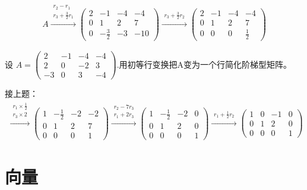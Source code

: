 \documentclass[a4paper]{report}
\begin{document}
\begin{jie}
\begin{align*}
A\xrightarrow{\substack{r_{2}-r_{1}\\ r_{3}+\frac{3}{2}r_{1}}}
{
\begin{pmatrix}
2&-1&-4&-4\\
0&1&2&7\\
0&-\frac{3}{2}&-3&-10
\end{pmatrix}
}\xrightarrow{\substack{ r_{3}+\frac{3}{2}r_{2}}}
{
\begin{pmatrix}
2&-1&-4&-4\\
0&1&2&7\\
0&0&0&\frac{1}{2}
\end{pmatrix}
}
\end{align*}
\end{jie}

\EX 设
$
A=
\begin{pmatrix}
2&-1&-4&-4\\
2&0&-2&3\\
-3&0&3&-4
\end{pmatrix}
$.用初等行变换把A变为一个行简化阶梯型矩阵。

\begin{jie}
接上题：
\begin{align*}
\xrightarrow{\substack{ r_{1}\times \frac{1}{2}\\ r_3\times 2}}
{
\begin{pmatrix}
1&-\frac{1}{2}&-2&-2\\
0&1&2&7\\
0&0&0&1
\end{pmatrix}
}\xrightarrow{\substack{ r_{2}-7r_3\\ r_1+2r_3}}
{
\begin{pmatrix}
1&-\frac{1}{2}&-2&0\\
0&1&2&0\\
0&0&0&1
\end{pmatrix}
}\xrightarrow{\substack{ r_{1}+\frac{1}{2}r_2}}
{
\begin{pmatrix}
1&0&-1&0\\
0&1&2&0\\
0&0&0&1
\end{pmatrix}
}
\end{align*}
\end{jie}
\chapter{向量}
\end{document}
